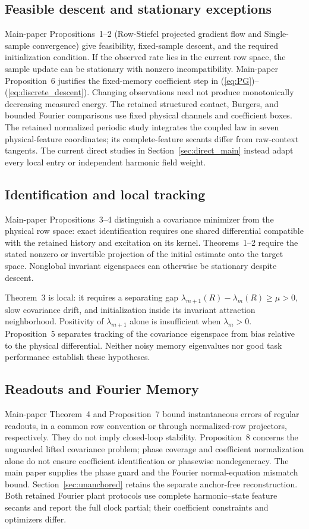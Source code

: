 \documentclass[journal]{IEEEtran}
\begin{document}
\subsection{Feasible descent and stationary exceptions}
Main-paper Propositions~1--2 (Row-Stiefel projected gradient flow and
Single-sample convergence) give feasibility, fixed-sample descent, and the
required initialization condition. If the observed rate lies in the current
row space, the sample update can be stationary with nonzero incompatibility.
Main-paper Proposition~6 justifies the fixed-memory coefficient step in
(\ref{eq:PG})--(\ref{eq:discrete_descent}). Changing observations need not
produce monotonically decreasing measured energy. The retained structured contact, Burgers, and bounded Fourier comparisons
use fixed physical channels and coefficient boxes. The retained normalized
periodic study integrates the coupled law in seven physical-feature
coordinates; its complete-feature secants differ from raw-context tangents.
The current direct studies in Section~\ref{sec:direct_main} instead adapt
every local entry or independent harmonic field weight.

\subsection{Identification and local tracking}
Main-paper Propositions~3--4 distinguish a covariance minimizer from the
physical row space: exact identification requires one shared differential
compatible with the retained history and excitation on its kernel.
Theorems~1--2 require the stated nonzero or invertible projection of the
initial estimate onto the target space. Nonglobal invariant eigenspaces
can otherwise be stationary despite descent.

Theorem~3 is local: it requires a separating gap
$\lambda_{m+1}(R)-\lambda_m(R)\ge\mu>0$, slow covariance drift, and
initialization inside its invariant attraction neighborhood. Positivity of
$\lambda_{m+1}$ alone is insufficient when $\lambda_m>0$.
Proposition~5 separates tracking of the covariance eigenspace from bias
relative to the physical differential. Neither noisy memory eigenvalues
nor good task performance establish these hypotheses.

\subsection{Readouts and Fourier Memory}
Main-paper Theorem~4 and Proposition~7 bound instantaneous errors of regular
readouts, in a common row convention or through normalized-row projectors,
respectively. They do not imply closed-loop stability. Proposition~8 concerns
the unguarded lifted covariance problem; phase coverage and coefficient
normalization alone do not ensure coefficient identification or phasewise
nondegeneracy. The main paper supplies the phase guard and the Fourier
normal-equation mismatch bound. Section~\ref{sec:unanchored} retains the
separate anchor-free reconstruction. Both retained Fourier plant protocols use
complete harmonic--state feature secants and report the full clock partial;
their coefficient constraints and optimizers differ.
\end{document}
